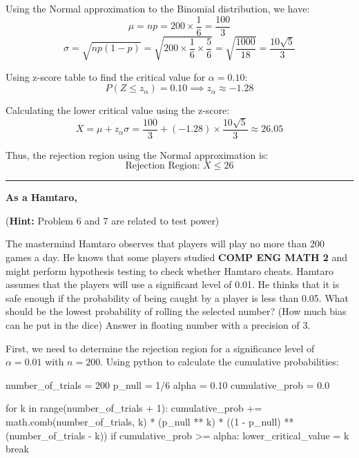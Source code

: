 \documentclass[a4paper, 10pt]{article}
\begin{document}
\begin{tosubmit}
\par\noindent\submitsolution
Using the Normal approximation to the Binomial distribution, we have:
\[ \mu = np = 200 \times \frac{1}{6} = \frac{100}{3} \]
\[ \sigma = \sqrt{np(1-p)} = \sqrt{200 \times \frac{1}{6} \times \frac{5}{6}} = \sqrt{\frac{1000}{18}} = \frac{10\sqrt{5}}{3} \]

Using z-score table to find the critical value for \( \alpha = 0.10 \):
\[ P(Z \leq z_{\alpha}) = 0.10 \implies z_{\alpha} \approx -1.28 \]

Calculating the lower critical value using the z-score:
\[ X = \mu + z_{\alpha} \sigma = \frac{100}{3} + (-1.28) \times \frac{10\sqrt{5}}{3} \approx 26.05 \]

Thus, the rejection region using the Normal approximation is:
\[ \boxed{ \text{Rejection Region: } X \leq 26 } \]

\vspace{3mm} \hrule \vspace{3mm}

\par\noindent \textbf{As a Hamtaro,}
\par\noindent (\textbf{Hint:} Problem 6 and 7 are related to test power)

\begin{subproblems}[resume]
    \item The mastermind Hamtaro observes that players will play no more than 200 games a day.
    He knows that some players studied \textbf{COMP ENG MATH 2} and might perform hypothesis testing to check whether Hamtaro cheats.
    Hamtaro assumes that the players will use a significant level of 0.01.
    He thinks that it is safe enough if the probability of being caught by a player is less than 0.05.
    What should be the lowest probability of rolling the selected number? (How much bias can he put in the dice)
    Answer in floating number with a precision of 3.
\end{subproblems}

\par\noindent\submitsolution
First, we need to determine the rejection region for a significance level of \( \alpha = 0.01 \) with \( n = 200 \).
Using python to calculate the cumulative probabilities:
\begin{codingbox}
number_of_trials = 200
p_null = 1/6
alpha = 0.10
cumulative_prob = 0.0

for k in range(number_of_trials + 1):
    cumulative_prob += math.comb(number_of_trials, k) * (p_null ** k) * ((1 - p_null) ** (number_of_trials - k))
    if cumulative_prob >= alpha:
        lower_critical_value = k
        break


\end{codingbox}
\end{tosubmit}
\end{document}
